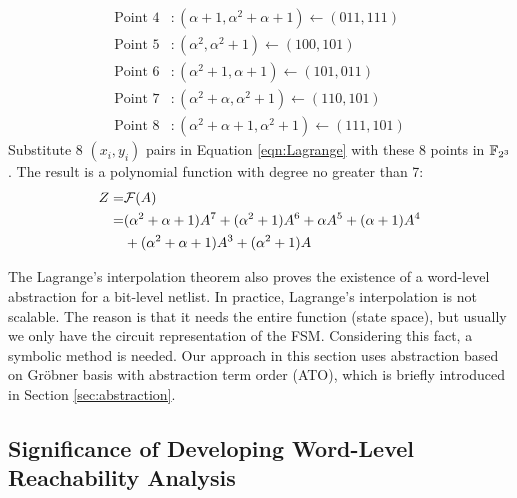 \begin{Example}
\begin{align*}
\text{Point }4&:  (\alpha + 1,\alpha^2 + \alpha + 1)\gets (011,111) \\
\text{Point }5&:  (\alpha^2,\alpha^2+1) \gets (100,101)\\
\text{Point }6&:  (\alpha^2 + 1,\alpha+1)\gets (101,011)\\
\text{Point }7&:  (\alpha^2 + \alpha,\alpha^2 + 1)\gets (110,101)\\
\text{Point }8&:  (\alpha^2 + \alpha + 1,\alpha^2 + 1)\gets (111,101)
\end{align*}
Substitute 8 $(x_i,y_i)$ pairs in Equation \ref{eqn:Lagrange} with these 8 points in ${\mathbb{F}}_{2^3}$.
The result is a polynomial function with degree no greater than 7:
\begin{align*}
Z =& {\mathcal{F}}(A) \\
=& (\alpha^2+\alpha+1) A^7 + (\alpha^2+1) A^6 + \alpha A^5 + (\alpha+1) A^4 \\
&+ (\alpha^2+\alpha+1)A^3+ (\alpha^2+1)A
\end{align*}

\end{Example}

The Lagrange's interpolation theorem also proves the existence of a word-level abstraction for a bit-level netlist.
In practice, Lagrange's interpolation is not scalable. 
The reason is that it needs the entire function (state space), but usually we only have the circuit representation
of the FSM. Considering this fact, a symbolic method is needed.
Our approach in this section uses abstraction based on 
Gr\"obner basis with abstraction term order (ATO), which is briefly introduced in Section \ref{sec:abstraction}.

\subsection{Significance of Developing Word-Level Reachability Analysis}

